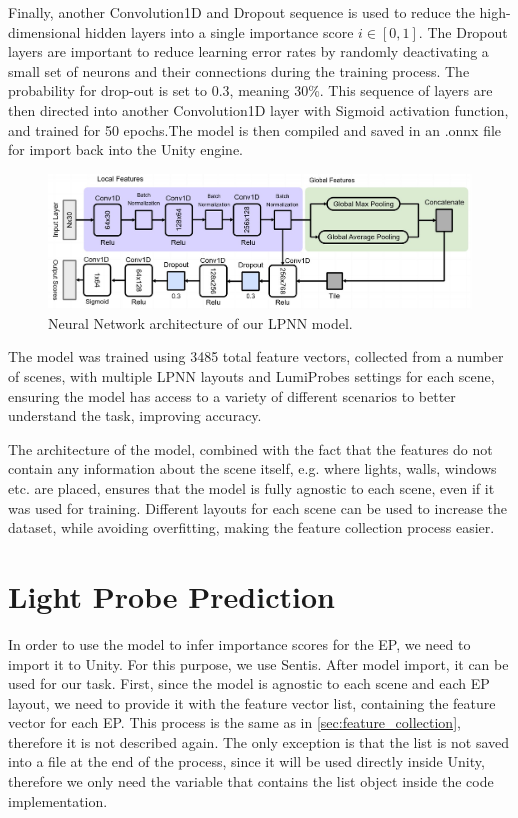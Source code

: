 Finally, another Convolution1D and Dropout sequence is used to reduce the high-dimensional hidden layers into a single importance score $i \in [0,1]$. The Dropout layers are important to reduce learning error rates by randomly deactivating a small set of neurons and their connections during the training process. The probability for drop-out is set to 0.3, meaning 30\%. This sequence of layers are then directed into another Convolution1D layer with Sigmoid activation function, and trained for 50 epochs.The model is then compiled and saved in an .onnx file for import back into the Unity engine.

\begin{figure}[h]
	\centering
	\includegraphics[width=\linewidth]{Graphics/LPNN.jpg}
	\caption{Neural Network architecture of our LPNN model.}
	\label{fig:LPNN_arch}
\end{figure}

The model was trained using 3485 total feature vectors, collected from a number of scenes, with multiple LPNN layouts and LumiProbes settings for each scene, ensuring the model has access to a variety of different scenarios to better understand the task, improving accuracy.\newline

The architecture of the model, combined with the fact that the features do not contain any information about the scene itself, e.g. where lights, walls, windows etc. are placed, ensures that the model is fully agnostic to each scene, even if it was used for training. Different layouts for each scene can be used to increase the dataset, while avoiding overfitting, making the feature collection process easier.

\section{Light Probe Prediction}
\label{sec:lp_predict}
In order to use the model to infer importance scores for the EP, we need to import it to Unity. For this purpose, we use Sentis. After model import, it can be used for our task. First, since the model is agnostic to each scene and each EP layout, we need to provide it with the feature vector list, containing the feature vector for each EP. This process is the same as in \ref{sec:feature_collection}, therefore it is not described again. The only exception is that the list is not saved into a file at the end of the process, since it will be used directly inside Unity, therefore we only need the variable that contains the list object inside the code implementation.


